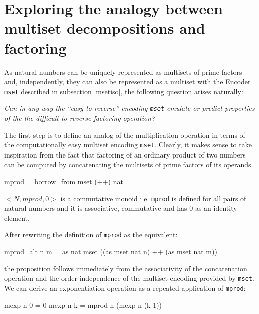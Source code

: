 \documentclass[]{INCLUDES/llncs}
\begin{document}
\section{Exploring the analogy between multiset decompositions and factoring}
\label{fact}
As natural numbers can be uniquely represented as multisets
of prime factors and, independently, they can also be represented as a multiset
with the Encoder {\tt mset} described in subsection \ref{msetiso}, the following
question arises naturally:

{\em Can in any way the ``easy to reverse'' encoding {\tt mset} emulate or
predict properties of the the difficult to reverse factoring operation?}

The first step is to define an analog of the multiplication operation in terms
of the computationally easy multiset encoding {\tt mset}. Clearly, it makes
sense to take inspiration from the fact that factoring of an ordinary product of 
two numbers can be computed by concatenating the multisets of 
prime factors of its operands.

\begin{code}
mprod = borrow_from mset (++) nat
\end{code}
\begin{prop}
$<N,mprod,0>$ is a commutative monoid i.e. {\tt mprod} is defined for all pairs of natural
numbers and it is associative, commutative
and has 0 as an identity element.
\end{prop}
After rewriting the definition of {\tt mprod} as the equivalent:
\begin{code}
mprod_alt n m = as nat mset ((as mset nat n) ++ (as mset nat m))
\end{code}
the proposition follows immediately from the associativity of the
concatenation operation and the order independence of the multiset
encoding provided by {\tt mset}.
We can derive an exponentiation operation 
as a repeated application of {\tt mprod}:
\begin{code}
mexp n 0 = 0
mexp n k = mprod n (mexp n (k-1))
\end{code}
\end{document}
